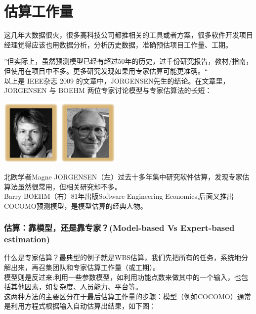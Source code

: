 \chapter{估算工作量} %


这几年大数据很火，很多高科技公司都推相关的工具或者方案，很多软件开发项目经理觉得应该也用数据分析，分析历史数据，准确预估项目工作量、工期。

''但实际上，虽然预测模型已经有超过50年的历史，过千份研究报告，教材/指南，但使用在项目中不多。更多研究发现如果用专家估算可能更准确。``\\
以上是 IEEE杂志 2009 的文章中，JORGENSEN先生的结论。在文章里，JORGENSEN
与 BOEHM 两位专家讨论模型与专家估算法的长短：


\includegraphics[width=6cm]{估算专家.png}

北欧学者Magne JORGENSEN（左）过去十多年集中研究软件估算，发现专家估算法虽然很常用，但相关研究却不多。\\
Barry BOEHM（右）81年出版Software Engineering Economics,后面又推出COCOMO预测模型，是模型估算的经典人物。

\hypertarget{ux4f30ux7b97ux9760ux6a21ux578bux8fd8ux662fux9760ux4e13ux5bb6model-based-vs-expert-based-estimation}{%
\subsection{估算：靠模型，还是靠专家？(Model-based Vs Expert-based
estimation)}\label{ux4f30ux7b97ux9760ux6a21ux578bux8fd8ux662fux9760ux4e13ux5bb6model-based-vs-expert-based-estimation}}

什么是专家估算？最典型的例子就是WBS估算，我们先把所有的任务，系统地分解出来，再召集团队和专家估算工作量（或工期）。\\
模型则是反过来:利用一些参数模型，如利用功能点数来做其中的一个输入，也包括其他因素，如复杂度、人员能力、平台等。\\
这两种方法的主要区分在于最后估算工作量的步骤：模型（例如COCOMO）通常是利用方程式根据输入自动估算出结果，如下图：\\

